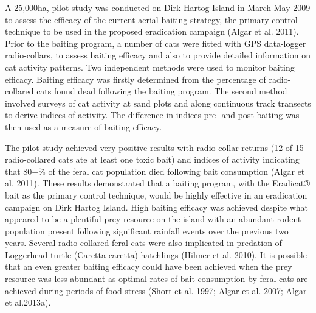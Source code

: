 \documentclass[version=last,
    paper=a4,                               %
    10pt,                                   %
    dvipsnames,
    oneside,                              %
    headings=openany,                       %
    open=any,
    BCOR=7mm,                               %
    DIV=15,     %
]{scrbook}
\begin{document}
A 25,000ha, pilot study was conducted on Dirk Hartog Island in March-May
2009 to assess the efficacy of the current aerial baiting strategy, the
primary control technique to be used in the proposed eradication
campaign (Algar et al. 2011). Prior to the baiting program, a number of
cats were fitted with GPS data-logger radio-collars, to assess baiting
efficacy and also to provide detailed information on cat activity
patterns. Two independent methods were used to monitor baiting efficacy.
Baiting efficacy was firstly determined from the percentage of
radio-collared cats found dead following the baiting program. The second
method involved surveys of cat activity at sand plots and along
continuous track transects to derive indices of activity. The difference
in indices pre- and post-baiting was then used as a measure of baiting
efficacy.

The pilot study achieved very positive results with radio-collar returns
(12 of 15 radio-collared cats ate at least one toxic bait) and indices
of activity indicating that 80+\% of the feral cat population died
following bait consumption (Algar et al. 2011). These results
demonstrated that a baiting program, with the Eradicat® bait as the
primary control technique, would be highly effective in an eradication
campaign on Dirk Hartog Island. High baiting efficacy was achieved
despite what appeared to be a plentiful prey resource on the island with
an abundant rodent population present following significant rainfall
events over the previous two years. Several radio-collared feral cats
were also implicated in predation of Loggerhead turtle (Caretta caretta)
hatchlings (Hilmer et al. 2010). It is possible that an even greater
baiting efficacy could have been achieved when the prey resource was
less abundant as optimal rates of bait consumption by feral cats are
achieved during periods of food stress (Short et al. 1997; Algar et al.
2007; Algar et al.2013a).
\end{document}

